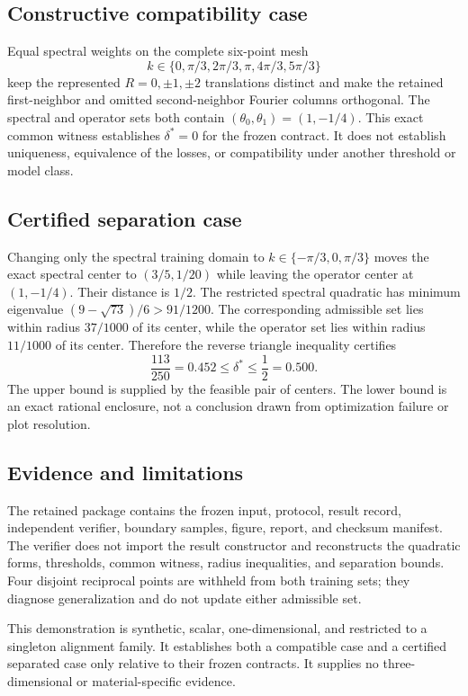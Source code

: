 \subsection{Constructive compatibility case}

Equal spectral weights on the complete six-point mesh
\begin{equation*}
 k\in\{0,\pi/3,2\pi/3,\pi,4\pi/3,5\pi/3\}
\end{equation*}
keep the represented $R=0,\pm1,\pm2$ translations distinct and make the
retained first-neighbor and omitted second-neighbor Fourier columns
orthogonal. The spectral and operator sets both
contain $(\theta_0,\theta_1)=(1,-1/4)$. This exact common witness establishes
$\delta^\ast=0$ for the frozen contract. It does not establish uniqueness,
equivalence of the losses, or compatibility under another threshold or model
class.

\subsection{Certified separation case}

Changing only the spectral training domain to
$k\in\{-\pi/3,0,\pi/3\}$ moves the exact spectral center to
$(3/5,1/20)$ while leaving the operator center at $(1,-1/4)$. Their distance is
$1/2$. The restricted spectral quadratic has minimum eigenvalue
$(9-\sqrt{73})/6>91/1200$. The corresponding admissible set lies within radius
$37/1000$ of its center, while the operator set lies within radius $11/1000$ of
its center. Therefore the reverse triangle inequality certifies
\begin{equation*}
 \frac{113}{250}=0.452
 \leq\delta^\ast\leq\frac12=0.500.
\end{equation*}
The upper bound is supplied by the feasible pair of centers. The lower bound is
an exact rational enclosure, not a conclusion drawn from optimization failure
or plot resolution.

\subsection{Evidence and limitations}

The retained package contains the frozen input, protocol, result record,
independent verifier, boundary samples, figure, report, and checksum manifest.
The verifier does not import the result constructor and reconstructs the
quadratic forms, thresholds, common witness, radius inequalities, and separation
bounds. Four disjoint reciprocal points are withheld from both training sets;
they diagnose generalization and do not update either admissible set.

This demonstration is synthetic, scalar, one-dimensional, and restricted to a
singleton alignment family. It establishes both a compatible case and a
certified separated case only relative to their frozen contracts. It supplies
no three-dimensional or material-specific evidence.
